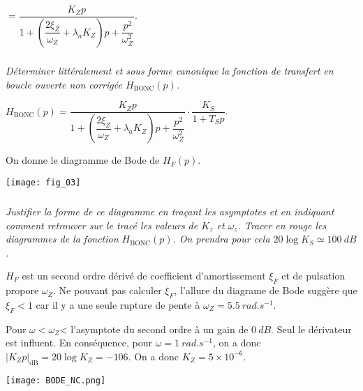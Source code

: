 \begin{multicols}{2}
\begin{multicols}{2}
\begin{corrige}
$= \dfrac{K_Z p}{ 1+\left(\dfrac{2\xi_Z}{\omega_Z}+\lambda_a K_Z\right)p+\dfrac{p^2}{\omega_Z^2} }$.
\end{corrige}
\else
\fi

\subparagraph{}\textit{Déterminer littéralement et sous forme canonique la fonction de transfert en boucle ouverte non corrigée $H_{\text{BONC}}(p)$.}
\ifprof
\begin{corrige}
$H_{\text{BONC}}(p) = \dfrac{K_Z p}{ 1+\left(\dfrac{2\xi_Z}{\omega_Z}+\lambda_a K_Z\right)p+\dfrac{p^2}{\omega_Z^2} } \cdot \dfrac{K_S}{1+T_Sp} $.
\end{corrige}
\else
\fi


\ifprof
\else
On donne le diagramme de Bode de $H_F(p)$.

\begin{center}
\texttt{[image: fig\_03]}
\end{center}
\fi

\subparagraph{}\textit{Justifier la forme de ce diagramme en traçant les asymptotes et en indiquant comment retrouver sur le tracé les valeurs de $K_z$ et $\omega_z$. Tracer en rouge les diagrammes de la fonction $H_{\text{BONC}}(p)$. On prendra pour cela $20\log K_S \simeq \SI{100}{dB}$.}
\ifprof
\begin{corrige}
$H_F$ est un second ordre dérivé de coefficient d'amortissement $\xi_{F}$ et de pulsation propore $\omega_{Z}$. Ne pouvant pas calculer $\xi_{F}$, l'allure du diagrame de Bode suggère que $\xi_{F}<1$ car il y a une seule rupture de pente à $\omega_Z= \SI{5,5}{rad.s^{-1}}$.

Pour $\omega<\omega_Z$< l'asymptote du second ordre à un gain de $\SI{0}{dB}$. Seul le dérivateur est influent. En conséquence, pour $\omega =\SI{1}{rad.s^{-1}}$, on a donc $\left| K_Z p\right|_{\text{dB}}=20\log K_Z=-106$. On a donc $K_Z=5\times 10^{-6}$. 

\begin{center}
\texttt{[image: BODE\_NC.png]}
\end{center}
\end{corrige}
\else
\fi


\end{multicols}
\end{multicols}
